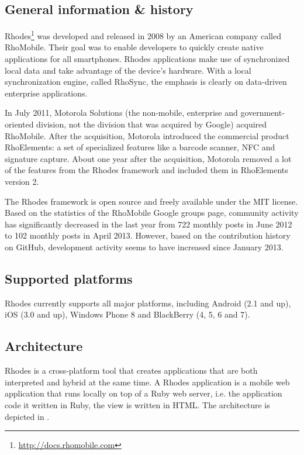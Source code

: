 \subsection{General information \& history}

Rhodes\footnote{\url{http://docs.rhomobile.com}} was developed and released in 2008 by an American company called RhoMobile. Their goal was to enable developers to quickly create native applications for all smartphones. Rhodes applications make use of synchronized local data and take advantage of the device's hardware. With a local synchronization engine, called RhoSync, the emphasis is clearly on data-driven enterprise applications.

In July 2011, Motorola Solutions (the non-mobile, enterprise and government-oriented division, not the division that was acquired by Google) acquired RhoMobile. After the acquisition, Motorola introduced the commercial product RhoElements: a set of specialized features like a barcode scanner, NFC and signature capture. About one year after the acquisition, Motorola removed a lot of the features from the Rhodes framework and included them in RhoElements version 2.

The Rhodes framework is open source and freely available under the MIT license. Based on the statistics of the RhoMobile Google groups page,  community activity has significantly decreased in the last year from 722 monthly posts in June 2012 to 102 monthly posts in April 2013. However, based on the contribution history on GitHub, development activity seems to have increased since January 2013.

\subsection{Supported platforms}

Rhodes currently supports all major platforms, including Android (2.1 and up), iOS (3.0 and up), Windows Phone 8 and BlackBerry (4, 5, 6 and 7).

\subsection{Architecture}

Rhodes is a cross-platform tool that creates applications that are both interpreted and hybrid at the same time. A Rhodes application is a mobile web application that runs locally on top of a Ruby web server, i.e. the application code it written in Ruby, the view is written in HTML. The architecture is depicted in .

